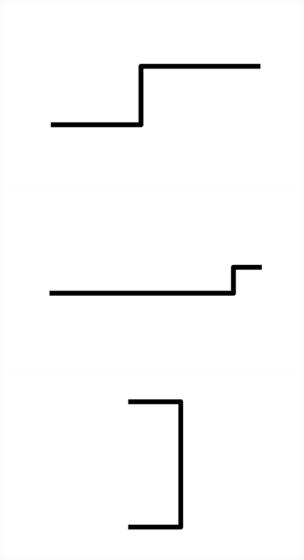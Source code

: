 \documentclass[]{report}
\begin{document}
\includegraphics[scale=.1]{pictures/21/state_cluster_shapes_373.pdf} 
\includegraphics[scale=.1]{pictures/21/state_cluster_shapes_374.pdf} 
\includegraphics[scale=.1]{pictures/21/state_cluster_shapes_375.pdf} 
\end{document}
